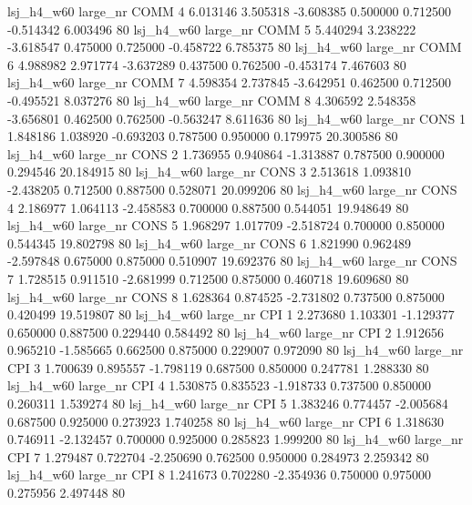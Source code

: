   lsj_h4_w60   large_nr     COMM                 4  6.013146  3.505318  -3.608385 0.500000 0.712500 -0.514342    6.003496 80
  lsj_h4_w60   large_nr     COMM                 5  5.440294  3.238222  -3.618547 0.475000 0.725000 -0.458722    6.785375 80
  lsj_h4_w60   large_nr     COMM                 6  4.988982  2.971774  -3.637289 0.437500 0.762500 -0.453174    7.467603 80
  lsj_h4_w60   large_nr     COMM                 7  4.598354  2.737845  -3.642951 0.462500 0.712500 -0.495521    8.037276 80
  lsj_h4_w60   large_nr     COMM                 8  4.306592  2.548358  -3.656801 0.462500 0.762500 -0.563247    8.611636 80
  lsj_h4_w60   large_nr     CONS                 1  1.848186  1.038920  -0.693203 0.787500 0.950000  0.179975   20.300586 80
  lsj_h4_w60   large_nr     CONS                 2  1.736955  0.940864  -1.313887 0.787500 0.900000  0.294546   20.184915 80
  lsj_h4_w60   large_nr     CONS                 3  2.513618  1.093810  -2.438205 0.712500 0.887500  0.528071   20.099206 80
  lsj_h4_w60   large_nr     CONS                 4  2.186977  1.064113  -2.458583 0.700000 0.887500  0.544051   19.948649 80
  lsj_h4_w60   large_nr     CONS                 5  1.968297  1.017709  -2.518724 0.700000 0.850000  0.544345   19.802798 80
  lsj_h4_w60   large_nr     CONS                 6  1.821990  0.962489  -2.597848 0.675000 0.875000  0.510907   19.692376 80
  lsj_h4_w60   large_nr     CONS                 7  1.728515  0.911510  -2.681999 0.712500 0.875000  0.460718   19.609680 80
  lsj_h4_w60   large_nr     CONS                 8  1.628364  0.874525  -2.731802 0.737500 0.875000  0.420499   19.519807 80
  lsj_h4_w60   large_nr      CPI                 1  2.273680  1.103301  -1.129377 0.650000 0.887500  0.229440    0.584492 80
  lsj_h4_w60   large_nr      CPI                 2  1.912656  0.965210  -1.585665 0.662500 0.875000  0.229007    0.972090 80
  lsj_h4_w60   large_nr      CPI                 3  1.700639  0.895557  -1.798119 0.687500 0.850000  0.247781    1.288330 80
  lsj_h4_w60   large_nr      CPI                 4  1.530875  0.835523  -1.918733 0.737500 0.850000  0.260311    1.539274 80
  lsj_h4_w60   large_nr      CPI                 5  1.383246  0.774457  -2.005684 0.687500 0.925000  0.273923    1.740258 80
  lsj_h4_w60   large_nr      CPI                 6  1.318630  0.746911  -2.132457 0.700000 0.925000  0.285823    1.999200 80
  lsj_h4_w60   large_nr      CPI                 7  1.279487  0.722704  -2.250690 0.762500 0.950000  0.284973    2.259342 80
  lsj_h4_w60   large_nr      CPI                 8  1.241673  0.702280  -2.354936 0.750000 0.975000  0.275956    2.497448 80
